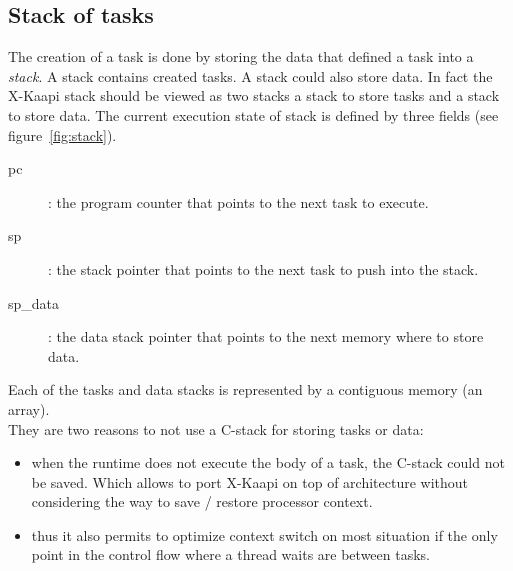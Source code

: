\documentclass[12pt]{report}
\newcommand{\kaapi}{\textsc{X}-Kaapi\xspace}
\begin{document}
\subsection{Stack of tasks}

The creation of a task is done by storing the data that defined a task into a \textit{stack}. A stack contains
created tasks. A stack could also store data. In fact the \kaapi stack should be viewed as two stacks
a stack to store tasks and a stack to store data. The current execution state of stack is defined by three
fields (see figure~\ref{fig:stack}).
\begin{description}
\item [pc]: the program counter that points to the next task to execute.
\item [sp]: the stack pointer that points to the next task to push into the stack.
\item [sp\_data]: the data stack pointer that points to the next memory where to store data.
\end{description}

Each of the tasks and data stacks is represented by a contiguous memory  (an array).\\

\noindent They are two reasons to not use a C-stack for storing tasks or data:
\begin{itemize}
\item when the runtime does not execute the body of a task, the C-stack could not be saved. Which allows to port \kaapi on top of architecture without considering the way to save / restore processor context.
\item thus it also permits to optimize context switch on most situation if the only point in the control flow where a thread waits are between tasks.
\end{itemize}
\end{document}
